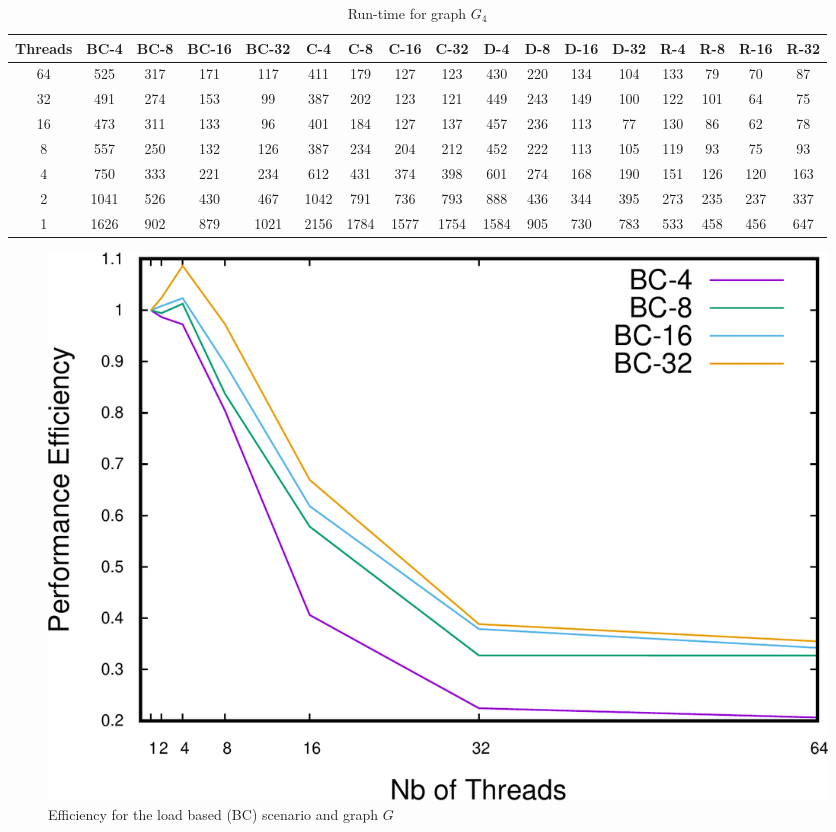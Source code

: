 \begin{table}[t]
\begin{minipage}[b]{\textwidth}
\caption{Run-time  for graph $G_4$}
\label{tab:graph4}
{\small
\begin{tabular}{||c||c|c|c|c||c|c|c|c||c|c|c|c||c|c|c|c|}
\hline
\textbf{Threads}	&\cellcolor{black!10}BC-4&	\cellcolor{black!10}BC-8	&\cellcolor{black!10}BC-16	&\cellcolor{black!10}BC-32&	\cellcolor{black!10}C-4	&\cellcolor{black!10}C-8&	\cellcolor{black!10}C-16&	\cellcolor{black!10}C-32&	\cellcolor{black!10}D-4&	\cellcolor{black!10}D-8	&\cellcolor{black!10}D-16&\cellcolor{black!10}	D-32&	\cellcolor{black!10}R-4	&\cellcolor{black!10}R-8&	\cellcolor{black!10}R-16&	\cellcolor{black!10}R-32 \\ \hline \hline
64 &		525&	317	&171&	117	&411	&179&	127	&123	&430	&220	&134	&104&	133&	79&	70	&87	 \\ \hline		
32	&	491&	274	&153	&99	&387	&202	&123	&121 &449	&243&	149&	100	&122	&101&	64&	75\\ \hline
16	&	473	&311	&133	&96	&401	&184	&127	&137 &457	&236	&113	&77	&130	&86	&62	&78 \\ \hline
8	&	557&	250	&132	&126	&387	&234	&204	&212 &452	&222	&113	&105	&119&	93	&75	&93 \\ \hline
4		&750&	333	&221	&234	&612	&431	&374	&398 &601	&274 &168	&190	&151	&126&	120	&163 \\ \hline
2		&1041 &526 &430 &467	&1042	&791	&736	&793 &888	&436	&344	&395	&273	&235	&237	&337 \\ \hline
1		&1626&902&879 &1021 &2156 &1784 &1577 &1754 &1584 &905 &730 &783& 533 &458 &456 &647 \\ \hline
\end{tabular}
}
\end{minipage}
\end{table}

\begin{figure}
\centering
\includegraphics[scale=0.35]{bench/bench-efficiency/efficiency-bc-1-crop.pdf}
\caption{Efficiency for the load based (BC) scenario and graph $G$}
\label{fig:effbc1}
\end{figure}

